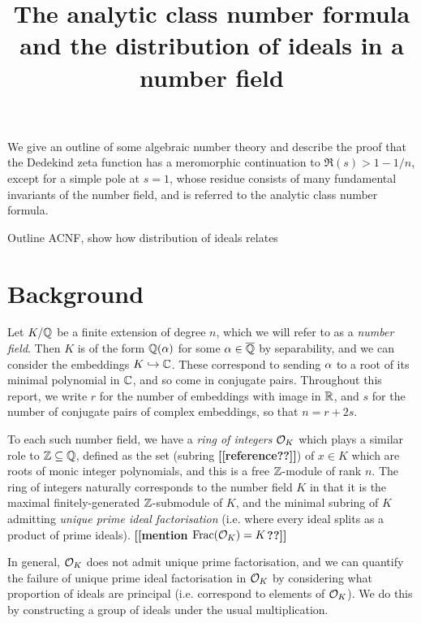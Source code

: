 \documentclass[11pt]{report}
\title{The analytic class number formula and the distribution of ideals in a number field}
\begin{document}
\maketitle
\abstract
We give an outline of some algebraic number theory and describe the proof that the Dedekind zeta function has a meromorphic continuation to $\Re(s) > 1 - 1/n$, except for a simple pole at $s = 1$, whose residue consists of many fundamental invariants of the number field, and is referred to the analytic class number formula.

Outline ACNF, show how distribution of ideals relates
\np
\tableofcontents
\chapter{Background} %
Let $K / \mathbb{Q}$ be a finite extension of degree $n$, which we will refer to as a \emph{number field}. Then $K$ is of the form $\mathbb{Q}(\alpha)$ for some $\alpha \in \overline{\mathbb{Q}}$ by separability, and we can consider the embeddings $K \hookrightarrow \mathbb{C}$. These correspond to sending $\alpha$ to a root of its minimal polynomial in $\mathbb{C}$, and so come in conjugate pairs. Throughout this report, we write $r$ for the number of embeddings with image in $\mathbb{R}$, and $s$ for the number of conjugate pairs of complex embeddings, so that $n = r + 2s$.

To each such number field, we have a \emph{ring of integers} $\mathcal{O}_K$ which plays a similar role to $\mathbb{Z} \subseteq \mathbb{Q}$, defined as the set (subring \textbf{[[reference??]]}) of $x \in K$ which are roots of monic integer polynomials, and this is a free $\mathbb{Z}$-module of rank $n$. The ring of integers naturally corresponds to the number field $K$ in that it is the maximal finitely-generated $\mathbb{Z}$-submodule of $K$, and the minimal subring of $K$ admitting \emph{unique prime ideal factorisation} (i.e. where every ideal splits as a product of prime ideals). \textbf{[[mention $\operatorname{Frac}(\mathcal{O}_K) = K$??]]} 

In general, $\mathcal{O}_K$ does not admit unique prime factorisation, and we can quantify the failure of unique prime ideal factorisation in $\mathcal{O}_K$ by considering what proportion of ideals are principal (i.e. correspond to elements of $\mathcal{O}_K$). We do this by constructing a group of ideals under the usual multiplication. 
\end{document}
